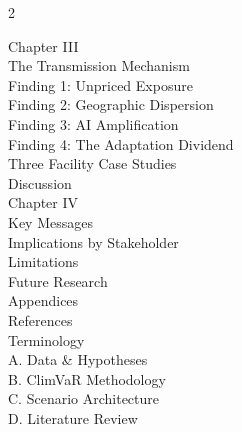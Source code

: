 \begin{multicols}{2}
{\columnbreak

{\fontsize{12}{15}\selectfont\displayfont\color{SEGreen}Chapter III}\\[3pt]
\noindent\hspace{5mm}The Transmission Mechanism \\[1pt]
\noindent\hspace{5mm}Finding 1: Unpriced Exposure \\[1pt]
\noindent\hspace{5mm}Finding 2: Geographic Dispersion \\[1pt]
\noindent\hspace{5mm}Finding 3: AI Amplification \\[1pt]
\noindent\hspace{5mm}Finding 4: The Adaptation Dividend \\[1pt]
\noindent\hspace{5mm}Three Facility Case Studies \\[1pt]
\noindent\hspace{5mm}Discussion \\[14pt]
%
{\fontsize{12}{15}\selectfont\displayfont\color{SEGreen}Chapter IV}\\[3pt]
\noindent\hspace{5mm}Key Messages \\[1pt]
\noindent\hspace{5mm}Implications by Stakeholder \\[1pt]
\noindent\hspace{5mm}Limitations \\[1pt]
\noindent\hspace{5mm}Future Research \\[14pt]
%
{\fontsize{12}{15}\selectfont\displayfont\color{SEGreen}Appendices}\\[3pt]
\noindent\hspace{5mm}References \\[1pt]
\noindent\hspace{5mm}Terminology \\[1pt]
\noindent\hspace{5mm}A. Data \& Hypotheses \\[1pt]
\noindent\hspace{5mm}B. ClimVaR Methodology \\[1pt]
\noindent\hspace{5mm}C. Scenario Architecture \\[1pt]
\noindent\hspace{5mm}D. Literature Review \\

}
\end{multicols}
